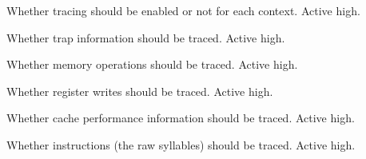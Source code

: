 \ifaceSubGroup{}
Whether tracing should be enabled or not for each context. Active high.
    
\ifaceSubGroup{}
Whether trap information should be traced. Active high.
    
\ifaceSubGroup{}
Whether memory operations should be traced. Active high.
    
\ifaceSubGroup{}
Whether register writes should be traced. Active high.
    
\ifaceSubGroup{}
Whether cache performance information should be traced. Active high.
    
\ifaceSubGroup{}
Whether instructions (the raw syllables) should be traced. Active high.
